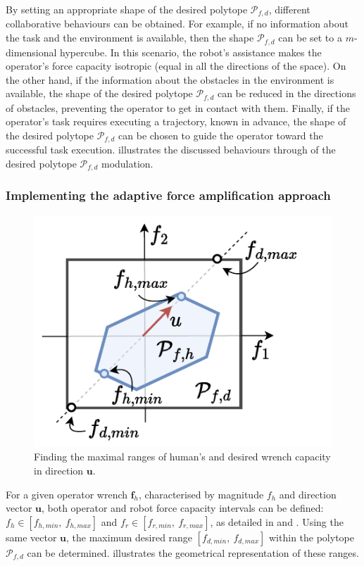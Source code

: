 By setting an appropriate shape of the desired polytope $\mathcal{P}_{f,d}$, different collaborative behaviours can be obtained. 
For example, if no information about the task and the environment is available, then the shape $\mathcal{P}_{f,d}$ can be set to a $m$-dimensional hypercube. In this scenario, the robot's assistance makes the operator's force capacity isotropic (equal in all the directions of the space).
On the other hand, if the information about the obstacles in the environment is available, the shape of the desired polytope $\mathcal{P}_{f,d}$ can be reduced in the directions of obstacles, preventing the operator to get in contact with them.
Finally, if the operator's task requires executing a trajectory, known in advance, the shape of the desired polytope $\mathcal{P}_{f,d}$ can be chosen to guide the operator toward the successful task execution.
 illustrates the discussed  behaviours through of the desired polytope $\mathcal{P}_{f,d}$ modulation.

\subsubsection*{Implementing the adaptive force amplification approach}

\begin{figure}
\vspace{-0.5cm}
    \includegraphics[trim=0.6cm 0cm 0.9cm 0.2cm,clip=true,width=\linewidth]{Papers/lichie/max_desired.pdf}
    \caption{Finding the maximal ranges of human's and desired wrench capacity in direction $\bm{u}$. }
    \label{fig:max_desired}
\end{figure}
For a given operator wrench $\bm{f}_h$, characterised by magnitude $f_h$ and direction vector $\bm{u}$, both operator and robot force capacity intervals can be defined: $f_h \in [f_{h,min}, ~f_{h,max}]$ and $f_r \in [f_{r,min}, ~f_{r,max}]$, as detailed in  and . Using the same vector $\bm{u}$, the maximum desired range $[f_{d,min}, ~f_{d,max}]$ within the polytope $\mathcal{P}_{f,d}$ can be determined.
 illustrates the geometrical representation of these ranges.

